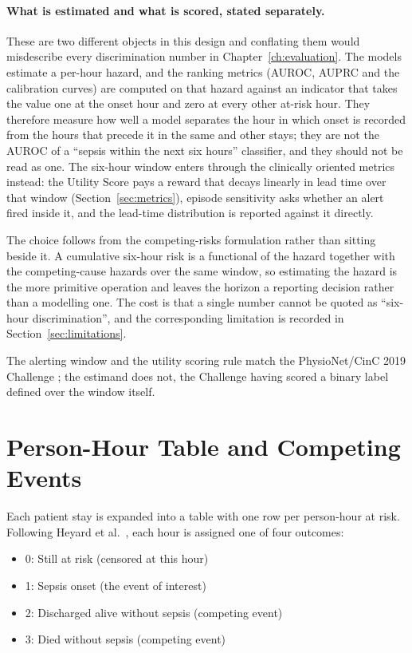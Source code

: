 \paragraph{What is estimated and what is scored, stated separately.} These are
two different objects in this design and conflating them would misdescribe every
discrimination number in Chapter~\ref{ch:evaluation}. The models estimate a
per-hour hazard, and the ranking metrics (AUROC, AUPRC and the calibration
curves) are computed on that hazard against an indicator that takes the value
one at the onset hour and zero at every other at-risk hour. They therefore
measure how well a model separates the hour in which onset is recorded from the
hours that precede it in the same and other stays; they are not the AUROC of a
``sepsis within the next six hours'' classifier, and they should not be read as
one. The six-hour window enters through the clinically oriented metrics instead:
the Utility Score pays a reward that decays linearly in lead time over that
window (Section~\ref{sec:metrics}), episode sensitivity asks whether an
alert fired inside it, and the lead-time distribution is reported against it
directly.

The choice follows from the competing-risks formulation rather than sitting
beside it. A cumulative six-hour risk is a functional of the hazard together
with the competing-cause hazards over the same window, so estimating the hazard
is the more primitive operation and leaves the horizon a reporting decision
rather than a modelling one. The cost is that a single number cannot be quoted
as ``six-hour discrimination'', and the corresponding limitation is recorded in
Section~\ref{sec:limitations}.

The alerting window and the utility scoring rule match the PhysioNet/CinC 2019
Challenge \cite{reyna2020utility}; the estimand does not, the Challenge having
scored a binary label defined over the window itself.


\section{Person-Hour Table and Competing Events}
\label{sec:person_hours}

Each patient stay is expanded into a table with one row per person-hour at
risk. Following Heyard et al.\ \cite{heyard2019dynamic}, each hour is
assigned one of four outcomes:

\begin{itemize}
    \item 0: Still at risk (censored at this hour)
    \item 1: Sepsis onset (the event of interest)
    \item 2: Discharged alive without sepsis (competing event)
    \item 3: Died without sepsis (competing event)
\end{itemize}

